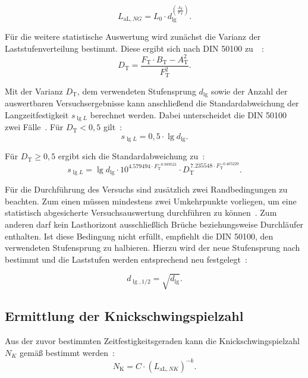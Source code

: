 \begin{equation} \label{eq:LaL_NG} 
    L_{\text{aL},NG} = L_0 \cdot d_{\lg}^{\left(\frac{A_{\text{T}}}{F_{\text{T}}}\right)}.
\end{equation}

Für die weitere statistische Auswertung wird zunächst die Varianz der Laststufenverteilung bestimmt. Diese ergibt sich nach DIN 50100 zu~~\cite[Seite~60]{DIN50100}:
\begin{equation}
\label{eq:D_T}
D_{\mathrm{T}} =\frac{F_{\mathrm{T}} \cdot B_{\mathrm{T}} - A_{\mathrm{T}}^{2}}{F_{\mathrm{T}}^{2}}.
\end{equation}

Mit der Varianz $D_{\text{T}}$, dem verwendeten Stufensprung $d_{\lg}$ sowie der Anzahl der auswertbaren Versuchsergebnisse kann anschließend die Standardabweichung der Langzeitfestigkeit $s_{\lg L}$ berechnet werden. Dabei unterscheidet die DIN 50100 zwei Fälle~\cite[Seite~61]{DIN50100}. Für $D_{\mathrm{T}} < 0{,}5$ gilt~:
\begin{equation}
\label{eq:s_lgL_1}
s_{\lg L} = 0{,}5 \cdot \lg d_{\lg}.
\end{equation}

Für $D_{\mathrm{T}} \geq 0{,}5$ ergibt sich die Standardabweichung zu~:
\begin{equation}
\label{eq:s_lgL_2}
s_{\lg L}
=
\lg d_{\lg}
\cdot 10^{4.579494 \cdot F_{\mathrm{T}}^{-0.889521}}
\cdot D_{\mathrm{T}}^{\,7.235548 \cdot F_{\mathrm{T}}^{-0.405229}}.
\end{equation}

Für die Durchführung des Versuchs sind zusätzlich zwei Randbedingungen zu beachten.
Zum einen müssen mindestens zwei Umkehrpunkte vorliegen, um eine statistisch abgesicherte Versuchsauswertung durchführen zu können~\cite[Seite~60--61]{DIN50100}. 
Zum anderen darf kein Lasthorizont ausschließlich Brüche beziehungsweise Durchläufer enthalten. Ist diese Bedingung nicht erfüllt, empfiehlt die DIN 50100, den verwendeten Stufensprung zu halbieren. Hierzu wird der neue Stufensprung nach~ bestimmt und die Laststufen werden entsprechend neu festgelegt~\cite[Seite~60--61]{DIN50100}: 

\begin{equation} \label{eq:d_lg_1_2} 
   d_{\lg,1/2} = \sqrt{d_{\lg}}.   
\end{equation}

	\subsection{Ermittlung der Knickschwingspielzahl}
	Aus der zuvor bestimmten Zeitfestigkeitsgeraden kann die Knickschwingspielzahl $N_K$ gemäß  bestimmt werden~\cite[Seite~62]{DIN50100}:
 \begin{equation} \label{eq:N_K} 
    N_{\text{K}} = C \cdot \left(L_{\text{aL},NK}\right)^{-k}.
\end{equation}


